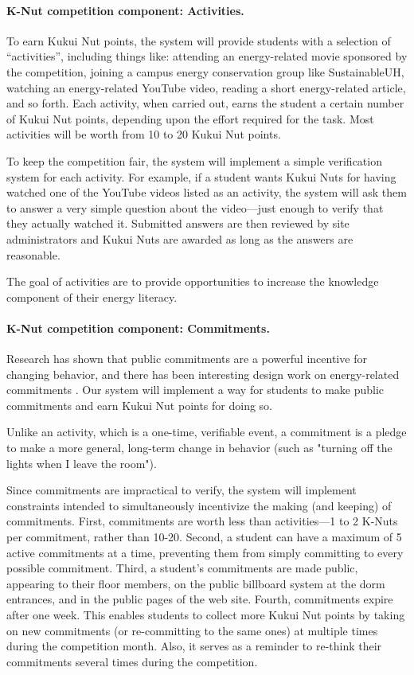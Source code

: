 \documentclass[11pt]{article}
\begin{document}
\paragraph{K-Nut competition component: Activities.}  To earn Kukui Nut
points, the system will provide students with a selection of
``activities'', including things like: attending an energy-related movie
sponsored by the competition, joining a campus energy conservation group
like SustainableUH, watching an energy-related YouTube video, reading a
short energy-related article, and so forth.  Each activity, when carried
out, earns the student a certain number of Kukui Nut points, depending upon
the effort required for the task.  Most activities will be worth from 10 to
20 Kukui Nut points.

To keep the competition fair, the system will implement a simple
verification system for each activity.  For example, if a student wants
Kukui Nuts for having watched one of the YouTube videos listed as an
activity, the system will ask them to answer a very simple question about
the video---just enough to verify that they actually watched it.  Submitted
answers are then reviewed by site administrators and Kukui Nuts are awarded
as long as the answers are reasonable.

The goal of activities are to provide opportunities to increase
the knowledge component of their energy literacy.

\paragraph{K-Nut competition component: Commitments.}  Research has shown
that public commitments are a powerful incentive for changing behavior, and
there has been interesting design work on energy-related commitments
\cite{Pierce09,StepGreen}.  Our system will implement a way for students to
make public commitments and earn Kukui Nut points for doing so.

Unlike an activity, which is a one-time, verifiable event, a commitment is
a pledge to make a more general, long-term change in behavior (such as "turning off
the lights when I leave the room").

Since commitments are impractical to verify, the system will implement
constraints intended to simultaneously incentivize the making (and keeping)
of commitments.  First, commitments are worth less than activities---1 to 2
K-Nuts per commitment, rather than 10-20.  Second, a student can have a
maximum of 5 active commitments at a time, preventing them from simply
committing to every possible commitment.  Third, a student's commitments
are made public, appearing to their floor members, on the public billboard
system at the dorm entrances, and in the public pages of the web site.
Fourth, commitments expire after one week.  This enables students to
collect more Kukui Nut points by taking on new commitments (or
re-committing to the same ones) at multiple times during the competition
month.  Also, it serves as a reminder to re-think their commitments several
times during the competition.
\end{document}
